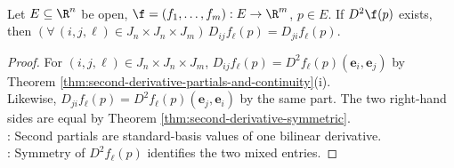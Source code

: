\begin{corollary} \label{cor:mixed-partials-from-second-derivative}
\\
Let $E\subseteq\R^n$ be open, $\f=(f_1,\ldots,f_m):E\to\R^m$, $p\in E$. If $D^2\f(p)$ exists, then $(\forall\,(i,j,\ell)\in J_n\times J_n\times J_m)\, D_{ij}f_\ell(p)=D_{ji}f_\ell(p)$.
\begin{proof}
For $(i,j,\ell)\in J_n\times J_n\times J_m$, $D_{ij}f_\ell(p)=D^2f_\ell(p)(\mathbf e_i,\mathbf e_j)$ by Theorem \ref{thm:second-derivative-partials-and-continuity}(i).\\
Likewise, $D_{ji}f_\ell(p)=D^2f_\ell(p)(\mathbf e_j,\mathbf e_i)$ by the same part. The two right-hand sides are equal by Theorem \ref{thm:second-derivative-symmetric}.\\
: Second partials are standard-basis values of one bilinear derivative.\\
: Symmetry of $D^2f_\ell(p)$ identifies the two mixed entries.
\end{proof}
\end{corollary}

